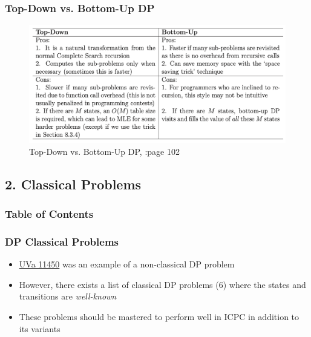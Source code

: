 \documentclass{beamer}
\begin{document}
\begin{frame}[fragile]
\frametitle{Top-Down vs. Bottom-Up DP}

\begin{figure}
    \centering
    \includegraphics[scale=0.45]{imgs/td_vs_bu.png}
	\caption{Top-Down vs. Bottom-Up DP, \cite{Halim}:page 102}
\end{figure}

\end{frame}


\subsection{2. Classical Problems}
\begin{frame}
	\frametitle{Table of Contents}
\end{frame}

\begin{frame}[fragile]
\frametitle{DP Classical Problems}

\begin{itemize}
    \item \href{https://onlinejudge.org/index.php?option=com_onlinejudge&Itemid=8&category=26&page=show_problem&problem=2445}{UVa 11450} was an example of a non-classical DP problem
    \item However, there exists a list of classical DP problems (6) where the states and transitions are \textit{well-known}
    \item These problems should be mastered to perform well in ICPC in addition to its variants
\end{itemize}

\end{frame}
\end{document}
